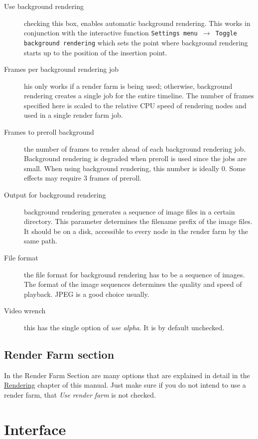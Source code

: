 \begin{description}
    \item[Use background rendering] checking this box, enables automatic background rendering.  This works in conjunction with the interactive function \texttt{Settings menu $\rightarrow$ Toggle background rendering} which sets the point where background rendering starts up to the position of the insertion point.
    \item[Frames per background rendering job] his only works if a render farm is being used; otherwise, background rendering creates a single job for the entire timeline. The number of frames specified here is scaled to the relative CPU speed of rendering nodes and used in a single render farm job.
    \item[Frames to preroll background] the number of frames to render ahead of each background rendering job. Background rendering is degraded when preroll is used since the jobs are small. When using background rendering, this number is ideally 0. Some effects may require 3 frames of preroll.
    \item[Output for background rendering] background rendering generates a sequence of image files in a certain directory. This parameter determines the filename prefix of the image files. It should be on a disk, accessible to every node in the render farm by the same path.
    \item[File format] the file format for background rendering has to be a sequence of images. The format of the image sequences determines the quality and speed of playback. JPEG is a good choice usually.
    \item[Video wrench] this has the single option of \textit{use alpha}.  It is by default unchecked.
\end{description}

\subsection{Render Farm section}%
\label{sub:render_farm_section}

In the Render Farm Section are many options that are explained in detail in the \hyperref[sec:render_farm_usage]{Rendering} chapter of this manual.  Just make sure if you do not intend to use a render farm, that \textit{Use render farm} is not checked.

\section{Interface}%
\label{sec:interface}

